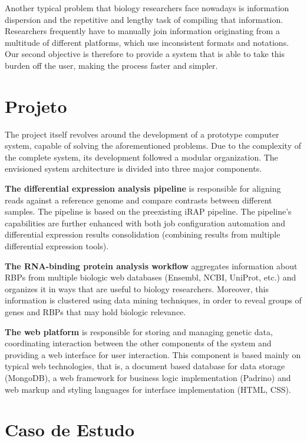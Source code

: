 \documentclass[9pt,a4paper]{extarticle}
\begin{document}
\begin{multicols}{2}
Another typical problem that biology researchers face nowadays is information
dispersion and the repetitive and lengthy task of compiling that information.
Researchers frequently have to manually join information originating from a
multitude of different platforms, which use inconsistent formats and notations.
Our second objective is therefore to provide a system that is able to take this
burden off the user, making the process faster and simpler.

\section{Projeto} \label{sec:project}

The project itself revolves around the development of a prototype computer
system, capable of solving the aforementioned problems. Due to the complexity
of the complete system, its development followed a modular organization. The
envisioned system architecture is divided into three major components.

  \textbf{The differential expression analysis pipeline}
  is responsible for aligning reads against a reference genome and compare
  contrasts between different samples. The pipeline is based on the preexisting
  iRAP pipeline. The pipeline's capabilities are further enhanced with both job
  configuration automation and differential expression results consolidation
  (combining results from multiple differential expression tools).

  \textbf{The RNA-binding protein analysis workflow}
  aggregates information about RBPs from multiple biologic web databases
  (Ensembl, NCBI, UniProt, etc.) and organizes it in ways that are useful to
  biology researchers. Moreover, this information is clustered using data mining
  techniques, in order to reveal groups of genes and RBPs that may hold biologic
  relevance.

  \textbf{The web platform}
  is responsible for storing and managing genetic data, coordinating interaction
  between the other components of the system and providing a web interface for
  user interaction. This component is based mainly on typical web technologies,
  that is, a document based database for data storage (MongoDB), a web framework
  for business logic implementation (Padrino) and web markup and styling
  languages for interface implementation (HTML, CSS).

\section{Caso de Estudo}


\end{multicols}
\end{document}
